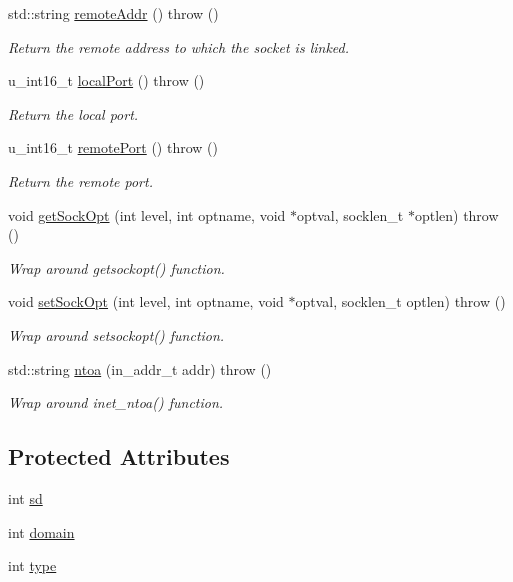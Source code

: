 \begin{CompactItemize}
std::string \hyperlink{classSocket_34aae0bd63e43ba30f91e77e52e95461}{remoteAddr} ()  throw ()
\begin{CompactList}\small\item\em Return the remote address to which the socket is linked. \item\end{CompactList}\item 
u\_\-int16\_\-t \hyperlink{classSocket_ca6ab90fa2a1098a143cc59bb4841d80}{localPort} ()  throw ()
\begin{CompactList}\small\item\em Return the local port. \item\end{CompactList}\item 
u\_\-int16\_\-t \hyperlink{classSocket_7cb1ce737346cbc92f7d1cc3d9578d38}{remotePort} ()  throw ()
\begin{CompactList}\small\item\em Return the remote port. \item\end{CompactList}\item 
void \hyperlink{classSocket_25b831123a5914c6203c72cb8a48026b}{getSockOpt} (int level, int optname, void $\ast$optval, socklen\_\-t $\ast$optlen)  throw ()
\begin{CompactList}\small\item\em Wrap around getsockopt() function. \item\end{CompactList}\item 
void \hyperlink{classSocket_5930d6cd7bc34b6de1126b80aad7bedd}{setSockOpt} (int level, int optname, void $\ast$optval, socklen\_\-t optlen)  throw ()
\begin{CompactList}\small\item\em Wrap around setsockopt() function. \item\end{CompactList}\item 
std::string \hyperlink{classSocket_6e7824108afe85f1004d17b4e3749cc7}{ntoa} (in\_\-addr\_\-t addr)  throw ()
\begin{CompactList}\small\item\em Wrap around inet\_\-ntoa() function. \item\end{CompactList}\end{CompactItemize}
\subsection*{Protected Attributes}
\begin{CompactItemize}
\item 
int \hyperlink{classSocket_d9e40b6c9a69e0168c27962cc6c60ef7}{sd}
\item 
int \hyperlink{classSocket_8b042d9fe02795041a5e045604c8b7ec}{domain}
\item 
int \hyperlink{classSocket_c7f6980f36023df2004271c336217cb8}{type}
\end{CompactItemize}


